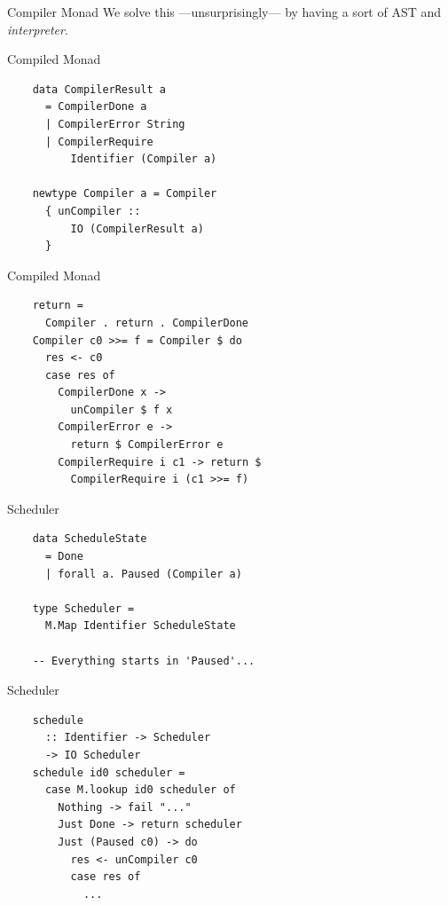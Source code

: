 \documentclass[20pt]{beamer}
\begin{document}
\begin{frame}{Compiler Monad}
    We solve this ---unsurprisingly--- by having a sort of AST and
    \emph{interpreter}.
\end{frame}

\begin{frame}[fragile]{Compiled Monad}
    \begin{lstlisting}
    data CompilerResult a
      = CompilerDone a
      | CompilerError String
      | CompilerRequire
          Identifier (Compiler a)

    newtype Compiler a = Compiler
      { unCompiler ::
          IO (CompilerResult a)
      }
    \end{lstlisting}
\end{frame}

\begin{frame}[fragile]{Compiled Monad}
    \begin{lstlisting}
    return =
      Compiler . return . CompilerDone
    Compiler c0 >>= f = Compiler $ do
      res <- c0
      case res of
        CompilerDone x ->
          unCompiler $ f x
        CompilerError e ->
          return $ CompilerError e
        CompilerRequire i c1 -> return $
          CompilerRequire i (c1 >>= f)
    \end{lstlisting}
\end{frame}

\begin{frame}[fragile]{Scheduler}
    \begin{lstlisting}
    data ScheduleState
      = Done
      | forall a. Paused (Compiler a)

    type Scheduler =
      M.Map Identifier ScheduleState

    -- Everything starts in 'Paused'...

    \end{lstlisting}
\end{frame}

\begin{frame}[fragile]{Scheduler}
    \begin{lstlisting}
    schedule
      :: Identifier -> Scheduler
      -> IO Scheduler
    schedule id0 scheduler =
      case M.lookup id0 scheduler of
        Nothing -> fail "..."
        Just Done -> return scheduler
        Just (Paused c0) -> do
          res <- unCompiler c0
          case res of
            ...
    \end{lstlisting}
\end{frame}
\end{document}
